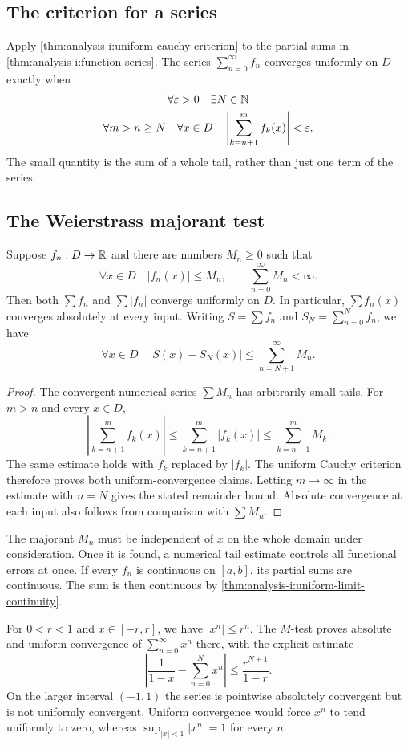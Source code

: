 \subsection{The criterion for a series}
Apply \autoref{thm:analysis-i:uniform-cauchy-criterion} to the partial
sums in \autoref{thm:analysis-i:function-series}. The series
$\sum_{n=0}^{\infty}f_n$ converges uniformly on $D$ exactly when
\[
  \begin{gathered}
    \forall\varepsilon>0\quad\exists N\in\mathbb{N}\\
    \forall m>n\ge N\quad\forall x\in D\quad
    \left|\sum_{k=n+1}^{m}f_k(x)\right|<\varepsilon.
  \end{gathered}
\]
The small quantity is the sum of a whole tail, rather than just one
term of the series.

\subsection{The Weierstrass majorant test}
\begin{theorem}
  \label{thm:analysis-i:weierstrass-m-test}
  Suppose $f_n:D\to\mathbb{R}$ and there are numbers $M_n\ge0$ such that
  \[
    \forall x\in D\quad |f_n(x)|\le M_n,\qquad
    \sum_{n=0}^{\infty}M_n<\infty.
  \]
  Then both $\sum f_n$ and $\sum |f_n|$ converge uniformly on $D$.
  In particular, $\sum f_n(x)$ converges absolutely at every input.
  Writing $S=\sum f_n$ and $S_N=\sum_{n=0}^N f_n$, we have
  \[
    \forall x\in D\quad
    |S(x)-S_N(x)|\le\sum_{n=N+1}^{\infty}M_n.
  \]
\end{theorem}
\begin{proof}
  The convergent numerical series $\sum M_n$ has arbitrarily small
  tails. For $m>n$ and every $x\in D$,
  \[
    \left|\sum_{k=n+1}^{m}f_k(x)\right|
      \le\sum_{k=n+1}^{m}|f_k(x)|
      \le\sum_{k=n+1}^{m}M_k.
  \]
  The same estimate holds with $f_k$ replaced by $|f_k|$. The uniform
  Cauchy criterion therefore proves both uniform-convergence claims.
  Letting $m\to\infty$ in the estimate with $n=N$ gives the stated
  remainder bound. Absolute convergence at each input also follows
  from comparison with $\sum M_n$.
\end{proof}

The majorant $M_n$ must be independent of $x$ on the whole domain under
consideration. Once it is found, a numerical tail estimate controls all
functional errors at once. If every $f_n$ is continuous on $[a,b]$,
its partial sums are continuous. The sum is then continuous by
\autoref{thm:analysis-i:uniform-limit-continuity}.

\begin{example}
  For $0<r<1$ and $x\in[-r,r]$, we have $|x^n|\le r^n$. The $M$-test
  proves absolute and uniform convergence of $\sum_{n=0}^{\infty}x^n$
  there, with the explicit estimate
  \[
    \left|\frac1{1-x}-\sum_{n=0}^{N}x^n\right|
      \le\frac{r^{N+1}}{1-r}.
  \]
  On the larger interval $(-1,1)$ the series is pointwise absolutely
  convergent but is not uniformly convergent. Uniform convergence
  would force $x^n$ to tend uniformly to zero, whereas
  $\sup_{|x|<1}|x^n|=1$ for every $n$.
\end{example}
